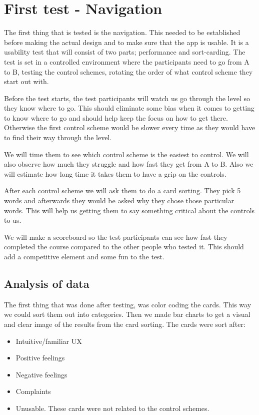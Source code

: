 \section{First test - Navigation}

The first thing that is tested is the navigation. This needed to be established before making the actual design and to make sure that the app is usable.
It is a usability test that will consist of two parts; performance and sort-carding. 
The test is set in a controlled environment where the participants need to go from A to B, testing the control schemes, rotating the order of what control scheme they start out with.

Before the test starts, the test participants will watch us go through the level so they know where to go. This should eliminate some bias when it comes to getting to know where to go and should help keep the focus on how to get there. Otherwise the first control scheme would be slower every time as they would have to find their way through the level.

We will time them to see which control scheme is the easiest to control. We will also observe how much they struggle and how fast they get from A to B. Also we will estimate how long time it takes them to have a grip on the controls.

After each control scheme we will ask them to do a card sorting. They pick 5 words and afterwards they would be asked why they chose those particular words. This will help us getting them to say something critical about the controls to us. 

We will make a scoreboard so the test participants can see how fast they completed the course compared to the other people who tested it.
This should add a competitive element and some fun to the test.

\subsection{Analysis of data}

The first thing that was done after testing, was color coding the cards. This way we could sort them out into categories. 
Then we made bar charts to get a visual and clear image of the results from the card sorting.
The cards were sort after:

\begin{itemize}
\item Intuitive/familiar UX
\item Positive feelings
\item Negative feelings
\item Complaints
\item Unusable. These cards were not related to the control schemes.
\end{itemize}

